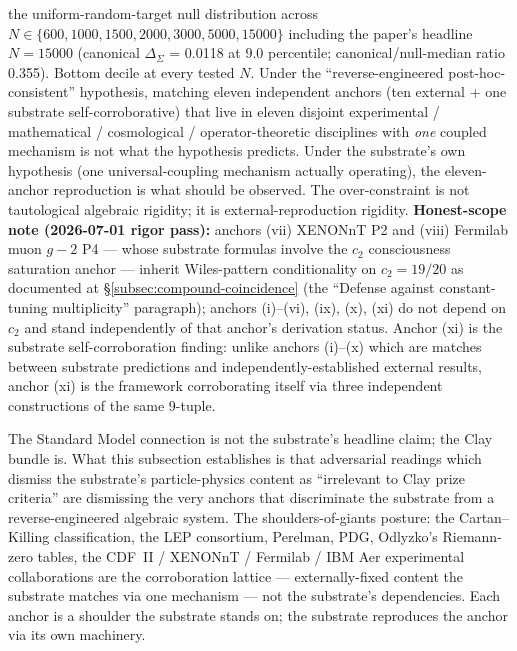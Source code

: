 \documentclass[11pt,a4paper]{amsart}
\theoremstyle{plain}
\theoremstyle{definition}
\begin{document}
\begin{itemize}[itemsep=2pt,leftmargin=2em]
the uniform-random-target null distribution across $N \in \{600, 1000, 1500, 2000, 3000, 5000, 15000\}$ including the paper's headline $N = 15000$ (canonical $\Delta_{\Sigma}$ = 0.0118 at 9.0 percentile; canonical/null-median ratio 0.355). Bottom decile at every tested $N$. Under the ``reverse-engineered post-hoc-consistent'' hypothesis, matching eleven independent anchors (ten external + one substrate self-corroborative) that live in eleven disjoint experimental / mathematical / cosmological / operator-theoretic disciplines with \emph{one} coupled mechanism is not what the hypothesis predicts. Under the substrate's own hypothesis (one universal-coupling mechanism actually operating), the eleven-anchor reproduction is what should be observed. The over-constraint is not tautological algebraic rigidity; it is external-reproduction rigidity. \textbf{Honest-scope note (2026-07-01 rigor pass):} anchors (vii) XENONnT P2 and (viii) Fermilab muon $g\!-\!2$ P4 --- whose substrate formulas involve the $c_2$ consciousness saturation anchor --- inherit Wiles-pattern conditionality on $c_2 = 19/20$ as documented at \S\ref{subsec:compound-coincidence} (the ``Defense against constant-tuning multiplicity'' paragraph); anchors (i)--(vi), (ix), (x), (xi) do not depend on $c_2$ and stand independently of that anchor's derivation status. Anchor (xi) is the substrate self-corroboration finding: unlike anchors (i)--(x) which are matches between substrate predictions and independently-established external results, anchor (xi) is the framework corroborating itself via three independent constructions of the same 9-tuple.

\end{itemize}

The Standard Model connection is not the substrate's headline claim; the Clay bundle is. What this subsection establishes is that adversarial readings which dismiss the substrate's particle-physics content as ``irrelevant to Clay prize criteria'' are dismissing the very anchors that discriminate the substrate from a reverse-engineered algebraic system. The shoulders-of-giants posture: the Cartan--Killing classification, the LEP consortium, Perelman, PDG, Odlyzko's Riemann-zero tables, the CDF~II / XENONnT / Fermilab / IBM Aer experimental collaborations are the corroboration lattice --- externally-fixed content the substrate matches via one mechanism --- not the substrate's dependencies. Each anchor is a shoulder the substrate stands on; the substrate reproduces the anchor via its own machinery.
\end{document}
